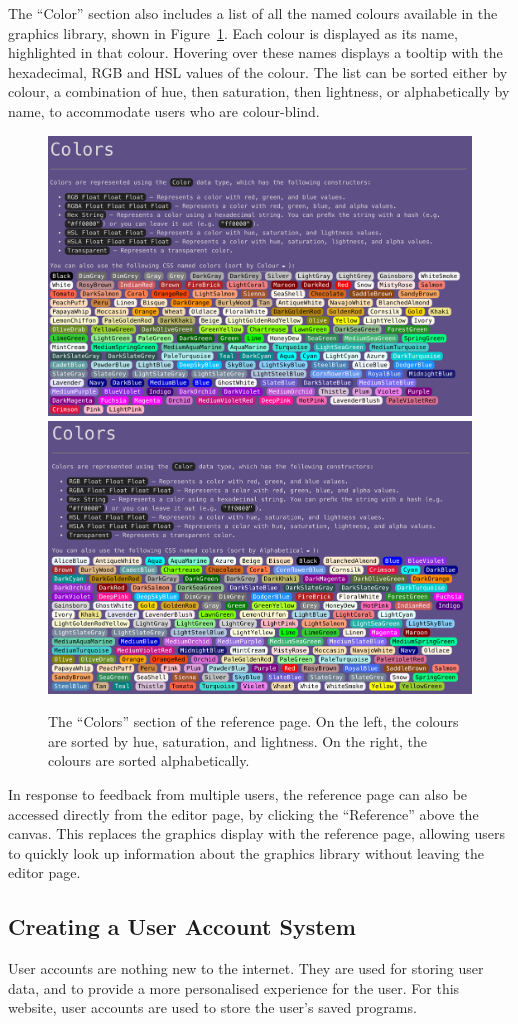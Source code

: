 \documentclass[../main.tex]{subfiles}
\begin{document}
            The ``Color'' section also includes a list of all the named colours available
                in the graphics library, shown in Figure~\ref{fig:colours}.
            Each colour is displayed as its name, highlighted in that colour.
            Hovering over these names displays a tooltip with the hexadecimal, RGB and HSL
                values of the colour.
            The list can be sorted either by colour, a combination of hue, then saturation,
                then lightness, or alphabetically by name, to accommodate users who are
                colour-blind.

            \begin{figure}[H]
                \centering
                \includegraphics[width=0.45\linewidth]{images/colours.png}
                \includegraphics[width=0.45\linewidth]{images/coloursAlphabetical.png}
                    \caption{The ``Colors'' section of the reference page.
                        On the left, the colours are sorted by hue, saturation, and lightness.
                        On the right, the colours are sorted alphabetically.
                    }
                    \label{fig:colours}
            \end{figure}

            In response to feedback from multiple users, the reference page can also be
                accessed directly from the editor page, by clicking the ``Reference'' above the
                canvas.
            This replaces the graphics display with the reference page, allowing users to
                quickly look up information about the graphics library without leaving the
                editor page.

        \subsection{Creating a User Account System}
            User accounts are nothing new to the internet.
            They are used for storing user data, and to provide a more personalised
                experience for the user.
            For this website, user accounts are used to store the user's saved programs.
\end{document}
